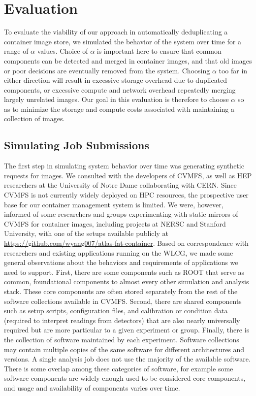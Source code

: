 \documentclass[conference]{IEEEtran}
\begin{document}
\section{Evaluation}

To evaluate the viability of our approach in automatically deduplicating a container image store,
we simulated the behavior of the system over time for a range of $\alpha$ values.
Choice of $\alpha$ is important here to ensure that common components can be detected and merged in container images,
and that old images or poor decisions are eventually removed from the system.
Choosing $\alpha$ too far in either direction will result in excessive storage overhead due to duplicated components,
or excessive compute and network overhead repeatedly merging largely unrelated images.
Our goal in this evaluation is therefore to choose $\alpha$ so as to minimize the storage and compute costs associated with maintaining a collection of images.

\subsection{Simulating Job Submissions}

The first step in simulating system behavior over time was generating synthetic requests for images.
We consulted with the developers of CVMFS,
as well as HEP researchers at the University of Notre Dame collaborating with CERN.
Since CVMFS is not currently widely deployed on HPC resources,
the prospective user base for our container management system is limited.
We were, however, informed of some researchers and groups experimenting with static mirrors of CVMFS for container images,
including projects at NERSC and Stanford University,
with one of the setups available publicly at \url{https://github.com/wyang007/atlas-fat-container}.
Based on correspondence with researchers and existing applications running on the WLCG,
we made some general observations about the behaviors and requirements of applications we need to support.
First, there are some components such as ROOT that serve as common, foundational components to almost every other simulation and analysis stack.
These core components are often stored separately from the rest of the software collections available in CVMFS.
Second, there are shared components such as setup scripts, configuration files, and calibration or condition data (required to interpret readings from detectors) that are also nearly universally required but are more particular to a given experiment or group.
Finally, there is the collection of software maintained by each experiment.
Software collections may contain multiple copies of the same software for different architectures and versions.
A single analysis job does not use the majority of the available software.
There is some overlap among these categories of software,
for example some software components are widely enough used to be considered core components,
and usage and availability of components varies over time.
\end{document}
